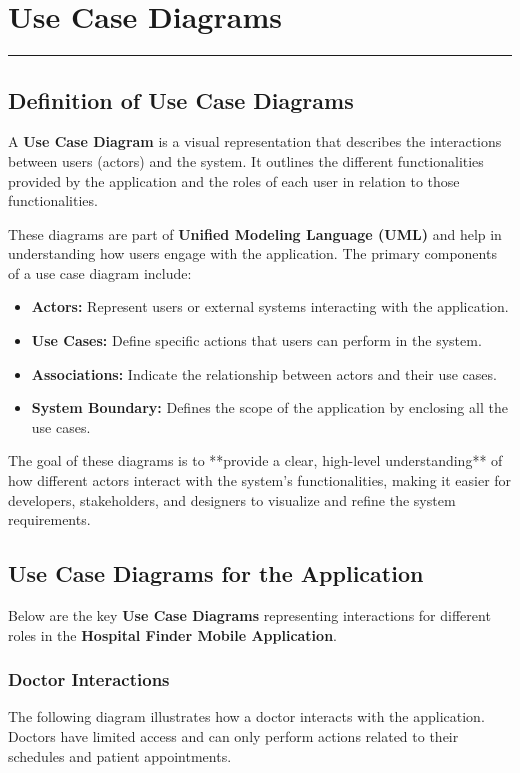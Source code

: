 \documentclass[12pt]{report}
\begin{document}
\section{\textbf{Use Case Diagrams}}  
\rule{0.45\linewidth}{0.7pt}  
\subsection{\textbf{Definition of Use Case Diagrams}}  


\noindent A \textbf{Use Case Diagram} is a visual representation that describes the interactions between users (actors) and the system. It outlines the different functionalities provided by the application and the roles of each user in relation to those functionalities.  

\noindent These diagrams are part of \textbf{Unified Modeling Language (UML)} and help in understanding how users engage with the application. The primary components of a use case diagram include:  

\begin{itemize}  
    \item \textbf{Actors:} Represent users or external systems interacting with the application.  
    \item \textbf{Use Cases:} Define specific actions that users can perform in the system.  
    \item \textbf{Associations:} Indicate the relationship between actors and their use cases.  
    \item \textbf{System Boundary:} Defines the scope of the application by enclosing all the use cases.  
\end{itemize}  

\noindent The goal of these diagrams is to **provide a clear, high-level understanding** of how different actors interact with the system’s functionalities, making it easier for developers, stakeholders, and designers to visualize and refine the system requirements.

\subsection{\textbf{Use Case Diagrams for the Application}}  

\noindent Below are the key \textbf{Use Case Diagrams} representing interactions for different roles in the \textbf{Hospital Finder Mobile Application}.  

\subsubsection{\textbf{Doctor Interactions}}  
The following diagram illustrates how a doctor interacts with the application. Doctors have limited access and can only perform actions related to their schedules and patient appointments.  
\end{document}
